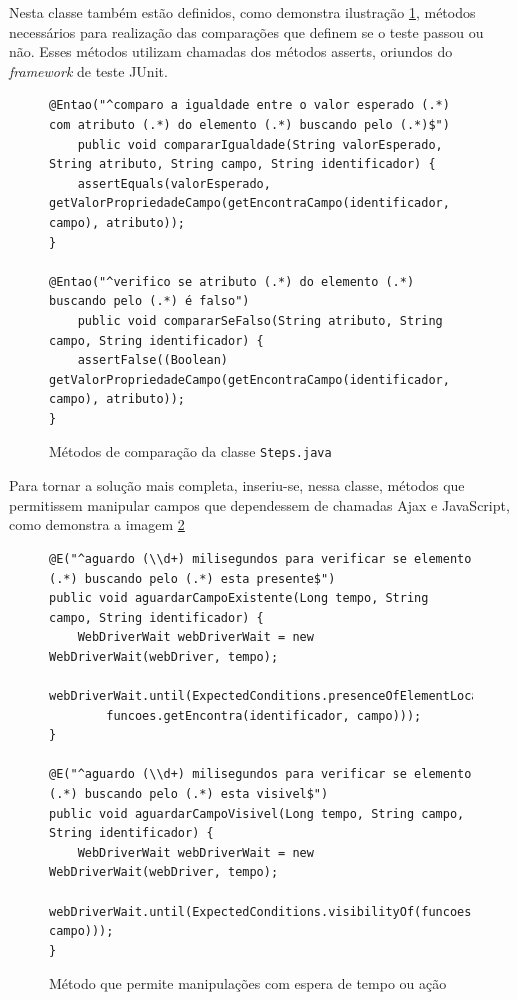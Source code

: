 \documentclass[tg]{mdtufsm}
\begin{document}
Nesta classe também estão definidos, como demonstra ilustração \ref{code:stepsJUnit}, métodos necessários para realização das comparações que definem se o teste passou ou não. Esses métodos utilizam chamadas dos métodos asserts, oriundos do \emph{framework} de teste JUnit.

\begin{figure}[!htt]
	\begin{lstlisting}
@Entao("^comparo a igualdade entre o valor esperado (.*) com atributo (.*) do elemento (.*) buscando pelo (.*)$")
	public void compararIgualdade(String valorEsperado, String atributo, String campo, String identificador) {
	assertEquals(valorEsperado, getValorPropriedadeCampo(getEncontraCampo(identificador, campo), atributo));
}

@Entao("^verifico se atributo (.*) do elemento (.*) buscando pelo (.*) é falso")
	public void compararSeFalso(String atributo, String campo, String identificador) {
	assertFalse((Boolean) getValorPropriedadeCampo(getEncontraCampo(identificador, campo), atributo));
}
	\end{lstlisting}
	\caption{Métodos de comparação da classe \texttt{Steps.java}}
	\label{code:stepsJUnit}
\end{figure}

Para tornar a solução mais completa, inseriu-se, nessa classe, métodos que permitissem manipular campos que dependessem de chamadas Ajax e JavaScript, como demonstra a imagem \ref{code:Método WebDriverWait}

\begin{figure}[!htt]
	\begin{lstlisting}
@E("^aguardo (\\d+) milisegundos para verificar se elemento (.*) buscando pelo (.*) esta presente$")
public void aguardarCampoExistente(Long tempo, String campo, String identificador) {
    WebDriverWait webDriverWait = new WebDriverWait(webDriver, tempo);
    webDriverWait.until(ExpectedConditions.presenceOfElementLocated(
        funcoes.getEncontra(identificador, campo)));
}

@E("^aguardo (\\d+) milisegundos para verificar se elemento (.*) buscando pelo (.*) esta visivel$")
public void aguardarCampoVisivel(Long tempo, String campo, String identificador) {
    WebDriverWait webDriverWait = new WebDriverWait(webDriver, tempo);
    webDriverWait.until(ExpectedConditions.visibilityOf(funcoes.getEncontraCampo(identificador, campo)));
}
	\end{lstlisting}
	\caption{Método que permite manipulações com espera de tempo ou ação}
	\label{code:Método WebDriverWait}
\end{figure}
\end{document}
